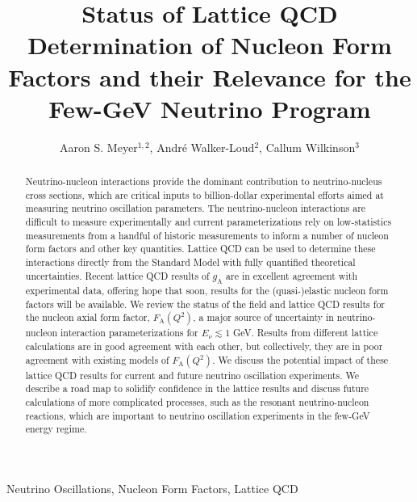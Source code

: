 \documentclass{ar-1col}
\begin{document}

\title{Status of Lattice QCD Determination of Nucleon Form Factors
 and their Relevance for the Few-GeV Neutrino Program}

\author{Aaron S. Meyer$^{1,2}$,
Andr\'{e} Walker-Loud$^2$,
Callum Wilkinson$^3$
}

\begin{abstract}
Neutrino-nucleon interactions provide the dominant contribution to neutrino-nucleus cross sections, which are critical inputs to billion-dollar experimental efforts aimed at measuring neutrino oscillation parameters.
The neutrino-nucleon interactions are difficult to measure experimentally and current parameterizations
rely on low-statistics measurements from a handful of historic measurements to inform a number of nucleon form factors and other key quantities.
Lattice QCD can be used to determine these interactions directly from the Standard Model with fully quantified theoretical uncertainties.
Recent lattice QCD results of $g_{\mathrm{A}}$ are in excellent agreement with experimental data,
offering hope that soon, results for the (quasi-)elastic nucleon form factors will be available.
We review the status of the field and lattice QCD results for the nucleon axial form factor, $F_{\mathrm{A}}(Q^2)$, a major source of uncertainty in neutrino-nucleon interaction parameterizations for $E_{\nu} \lesssim 1$ GeV.
Results from different lattice calculations are in good agreement with each other, but collectively, they are in poor agreement with existing models of $F_{\mathrm{A}}(Q^2)$.
We discuss the potential impact of these lattice QCD results for current and future neutrino oscillation experiments.
We describe a road map to solidify confidence in the lattice results and discuss future calculations of more complicated processes, such as the resonant neutrino-nucleon reactions, which are important to neutrino oscillation experiments in the few-GeV energy regime.
\end{abstract}

\begin{keywords}
Neutrino Oscillations, Nucleon Form Factors, Lattice QCD
\end{keywords}
\end{document}
